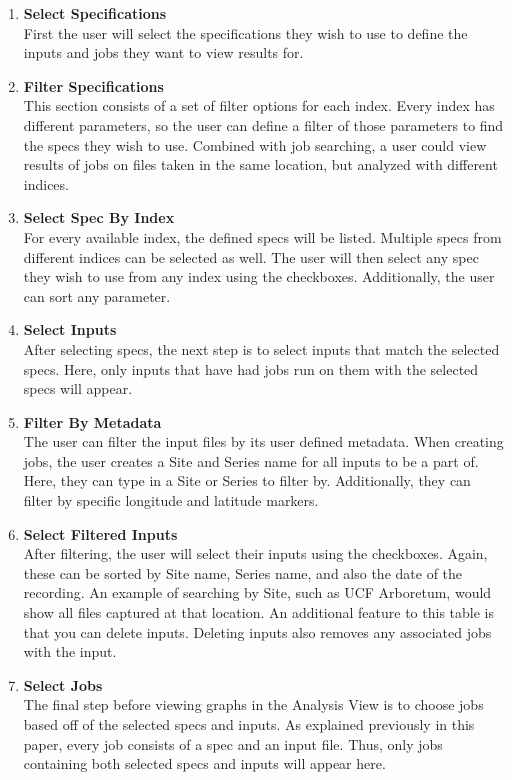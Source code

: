 \begin{enumerate}
    \item \textbf{Select Specifications}\\ First the user will select the specifications they wish to use to define the inputs and jobs they want to view results for.
    \item \textbf{Filter Specifications}\\ This section consists of a set of filter options for each index. Every index has different parameters, so the user can define a filter of those parameters to find the specs they wish to use. Combined with job searching, a user could view results of jobs on files taken in the same location, but analyzed with different indices.
    \item \textbf{Select Spec By Index}\\ For every available index, the defined specs will be listed. Multiple specs from different indices can be selected as well. The user will then select any spec they wish to use from any index using the checkboxes. Additionally, the user can sort any parameter.
    \item \textbf{Select Inputs}\\ After selecting specs, the next step is to select inputs that match the selected specs. Here, only inputs that have had jobs run on them with the selected specs will appear.
    \item \textbf{Filter By Metadata}\\ The user can filter the input files by its user defined metadata. When creating jobs, the user creates a Site and Series name for all inputs to be a part of. Here, they can type in a Site or Series to filter by. Additionally, they can filter by specific longitude and latitude markers.
    \item \textbf{Select Filtered Inputs}\\ After filtering, the user will select their inputs using the checkboxes. Again, these can be sorted by Site name, Series name, and also the date of the recording. An example of searching by Site, such as \textquotesingle UCF Arboretum\textquotesingle , would show all files captured at that location. An additional feature to this table is that you can delete inputs. Deleting inputs also removes any associated jobs with the input.
    \item \textbf{Select Jobs}\\ The final step before viewing graphs in the Analysis View is to choose jobs based off of the selected specs and inputs. As explained previously in this paper, every job consists of a spec and an input file. Thus, only jobs containing both selected specs and inputs will appear here.

\end{enumerate}
